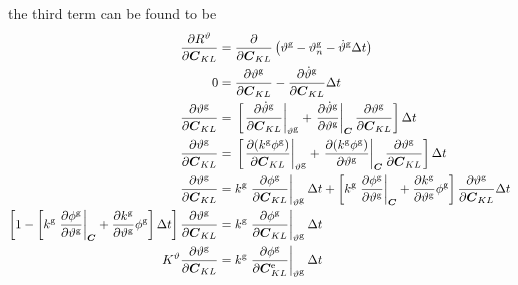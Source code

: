 \documentclass[10pt,letterpaper,oneside]{report}
\newcommand{\ten}[1]{\mbox{\boldmath $#1$}{}}
\newcommand{\scas}[1]{\mbox{{\scriptsize{${\rm{#1}}$}}}{}}
\newcommand{\tens}[1]{\mbox{\boldmath{\scriptsize{$#1$}}}{}}
\begin{document}
\begin{itemize}
\begin{equation}
\end{equation}
the third term can be found to be
\begin{align}
\frac{\partial R^\vartheta}{\partial \ten{C}_{KL} } 
={}& \frac{\partial }{\partial \ten{C}_{KL} } \left( \vartheta^{\scas{g}} - \vartheta^{\scas{g}}_n - \dot{\vartheta}^{\scas{g}} \Delta t \right) 
\notag \\
0 
={}& \frac{\partial \vartheta^{\scas{g}} }{\partial \ten{C}_{KL} } - \frac{\partial \dot{\vartheta}^{\scas{g}} }{\partial \ten{C}_{KL} } \Delta t 
\notag \\
\frac{\partial \vartheta^{\scas{g}} }{\partial \ten{C}_{KL} } 
={}& \left[ \left. \frac{\partial \dot{\vartheta}^{\scas{g}} }{\partial \ten{C}_{KL} } \right|_{\vartheta^{\scas{g}}} + \left. \frac{\partial \dot{\vartheta}^{\scas{g}} }{\partial \vartheta^{\scas{g}}} \right|_{\tens{C}} \frac{\partial \vartheta^{\scas{g}} }{\partial \ten{C}_{KL} } \right] \Delta t 
\notag \\
\frac{\partial \vartheta^{\scas{g}} }{\partial \ten{C}_{KL} } 
={}& \left[ \left. \frac{ \partial ( k^{\scas{g}} \phi^{\scas{g}} ) }{\partial \ten{C}_{KL} } \right|_{\vartheta^{\scas{g}}} + \left. \frac{ \partial ( k^{\scas{g}} \phi^{\scas{g}} ) }{\partial \vartheta^{\scas{g}}} \right|_{\tens{C}} \frac{\partial \vartheta^{\scas{g}} }{\partial \ten{C}_{KL} } \right] \Delta t
\notag \\
\frac{\partial \vartheta^{\scas{g}} }{\partial \ten{C}_{KL} } 
={}& k^{\scas{g}} \left. \frac{ \partial \phi^{\scas{g}} }{\partial \ten{C}_{KL} } \right|_{\vartheta^{\scas{g}}} \Delta t + \left[ k^{\scas{g}} \left. \frac{ \partial \phi^{\scas{g}} }{\partial \vartheta^{\scas{g}}} \right|_{\tens{C}} + \frac{ \partial k^{\scas{g}} }{\partial \vartheta^{\scas{g}}} \phi^{\scas{g}} \right] \frac{\partial \vartheta^{\scas{g}} }{\partial \ten{C}_{KL} } \Delta t
\notag \\
\left[ 1 - \left[ k^{\scas{g}} \left. \frac{\partial \phi^{\scas{g}} }{\partial \vartheta^{\scas{g}}} \right|_{\tens{C}} + \frac{\partial k^{\scas{g}} }{\partial \vartheta^{\scas{g}}} \phi^{\scas{g}} \right] \Delta t \right] \frac{\partial \vartheta^{\scas{g}} }{\partial \ten{C}_{KL} }  
={}& k^{\scas{g}} \left. \frac{\partial \phi^{\scas{g}} }{\partial \ten{C}_{KL} } \right|_{\vartheta^{\scas{g}}} \Delta t 
\notag \\
K^\vartheta \frac{\partial \vartheta^{\scas{g}} }{\partial \ten{C}_{KL} } 
={}& k^{\scas{g}} \left. \frac{\partial \phi^{\scas{g}} }{\partial \ten{C}_{KL} ^{\scas{e}}} \right|_{\vartheta^{\scas{g}}} \Delta t 

\end{align}
\end{itemize}
\end{document}
